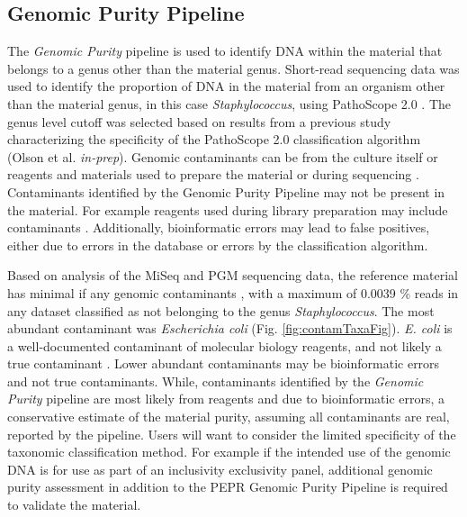 \documentclass[smallextended]{svjour3}\usepackage[]{graphicx}\usepackage[]{color}
\begin{document}
\subsection{Genomic Purity Pipeline}
The \textit{Genomic Purity} pipeline is used to identify DNA within the material that belongs to a genus other than the material genus. 
Short-read sequencing data was used to identify the proportion of DNA in the material from an organism other than the material genus, in this case \textit{Staphylococcus}, using PathoScope 2.0 \cite{Hong2014}. 
The genus level cutoff was selected based on results from a previous study characterizing the specificity of the PathoScope 2.0 classification algorithm (Olson et al. \textit{in-prep}). 
Genomic contaminants can be from the culture itself or reagents and materials used to prepare the material or during sequencing \cite{Shrestha2013,Tang2003,Salter2014}. 
Contaminants identified by the Genomic Purity Pipeline may not be present in the material. 
For example reagents used during library preparation may include contaminants \cite{Tanner1998,Newsome2004,Motley2014,Salter2014}. 
Additionally, bioinformatic errors may lead to false positives, either due to errors in the database or errors by the classification algorithm. 

Based on analysis of the MiSeq and PGM sequencing data, the reference material has minimal if any genomic contaminants %
, with a maximum of 0.0039 \% reads in any dataset classified as not belonging to the genus \textit{Staphylococcus}. 
The most abundant contaminant was \textit{Escherichia coli} (Fig. \ref{fig:contamTaxaFig}). 
\textit{E. coli} is a well-documented contaminant of molecular biology reagents, and not likely a true contaminant \cite{Salter2014}. Lower abundant contaminants may be bioinformatic errors and not true contaminants. 
While, contaminants identified by the \textit{Genomic Purity} pipeline are most likely from reagents and due to bioinformatic errors, a conservative estimate of the material purity, assuming all contaminants are real, reported by the pipeline. 
Users will want to consider the limited specificity of the taxonomic classification method. 
For example if the intended use of the genomic DNA is for use as part of an inclusivity exclusivity panel, additional genomic purity assessment in addition to the PEPR Genomic Purity Pipeline is required to validate the material.

\end{document}
